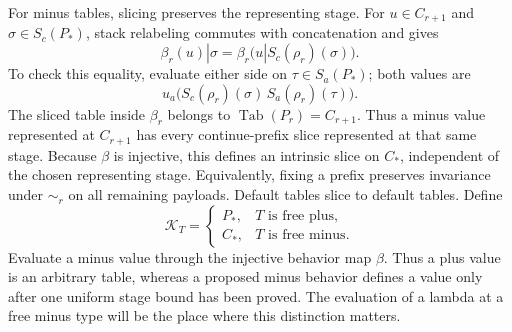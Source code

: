 For minus tables, slicing preserves the representing stage.
For $u\in C_{r+1}$ and $\sigma\in S_c(P_*)$,
stack relabeling commutes with concatenation and gives
\begin{equation}
  \beta_r(u)|\sigma
     =\beta_r\bigl(u|S_c(\rho_r)(\sigma)\bigr).
  \label{obs:free-slice-bound}
\end{equation}
To check this equality, evaluate either side on
$\tau\in S_a(P_*)$; both values are
\[
  u_a\bigl(S_c(\rho_r)(\sigma)\,
                 S_a(\rho_r)(\tau)\bigr).
\]
The sliced table inside $\beta_r$ belongs to
$\operatorname{Tab}(P_r)=C_{r+1}$.  Thus a minus value represented
at $C_{r+1}$ has every continue-prefix slice represented at that
same stage.  Because $\beta$ is injective, this defines an intrinsic
slice on $C_*$, independent of the chosen representing stage.
Equivalently, fixing a prefix preserves invariance under
$\sim_r$ on all remaining payloads.  Default tables slice to
default tables.  Define
\[
 \mathcal K_T=\begin{cases}P_*,&T\text{ is free plus},\\
 C_*,&T\text{ is free minus}.\end{cases}
\]
Evaluate a minus value through the injective behavior map $\beta$.
Thus a plus value is an arbitrary table, whereas a proposed minus
behavior defines a value only after one uniform stage bound has been
proved.  The evaluation of a lambda at a free minus type will be the
place where this distinction matters.
